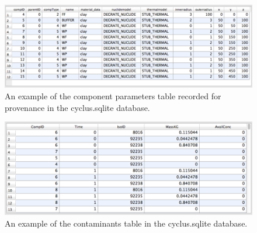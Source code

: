   \begin{figure}[htbp!]
    \begin{center}
      \includegraphics[width=\textwidth]{./chapters/paradigm/comp_table.eps}
      \caption[An example \Cyder output table of component parameters.]{An example of the \Cyder component parameters table recorded for provenance in the cyclus.sqlite database.}
      \label{fig:comp_table}
    \end{center}
  \end{figure}

  \begin{figure}[htbp!]
    \begin{center}
      \includegraphics[width=\textwidth]{./chapters/paradigm/cont_table.eps}
      \caption[An example \Cyder output table of contaminant history.]{An example of the \Cyder contaminants table in the cyclus.sqlite database.}
      \label{fig:cont_table}
    \end{center}
  \end{figure}
